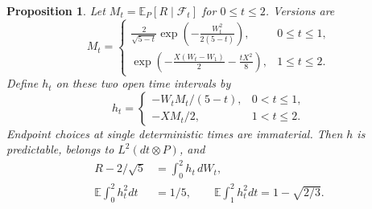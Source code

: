 \documentclass[11pt]{article}
\newtheorem{proposition}[theorem]{Proposition}
\theoremstyle{remark}\newtheorem{remark}[theorem]{Remark}
\newcommand{\E}{\mathbb E}
\newcommand{\F}{\mathcal F}
\begin{document}
\begin{proposition}\label{prop:integrand}
Let $M_t=\E_P[R\mid\F_t]$ for $0\le t\le2$. Versions are
\begin{equation}\label{eq:Mt}
 M_t=\begin{cases}
 \displaystyle\frac{2}{\sqrt{5-t}}\exp\!\left(-\frac{W_t^2}{2(5-t)}\right),&0\le t\le1,\\[6pt]
 \displaystyle\exp\!\left(-\frac{X(W_t-W_1)}2-\frac{tX^2}{8}\right),&1\le t\le2.
 \end{cases}
\end{equation}
Define $h_t$ on these two open time intervals by
\begin{equation}\label{eq:ht}
 h_t=\begin{cases}
 -W_t M_t/(5-t),&0<t\le1,\\
 -X M_t/2,&1<t\le2.
 \end{cases}
\end{equation}
Endpoint choices at single deterministic times are immaterial. Then $h$ is predictable, belongs to $L^2(dt\otimes P)$, and
\begin{align}
 R-2/\sqrt5&=\int_0^2h_t\,dW_t,\label{eq:representation}\\
 \E\int_0^2h_t^2dt&=1/5,\qquad
 \E\int_1^2h_t^2dt=1-\sqrt{2/3}.\label{eq:energies}
\end{align}
\end{proposition}
\end{document}
